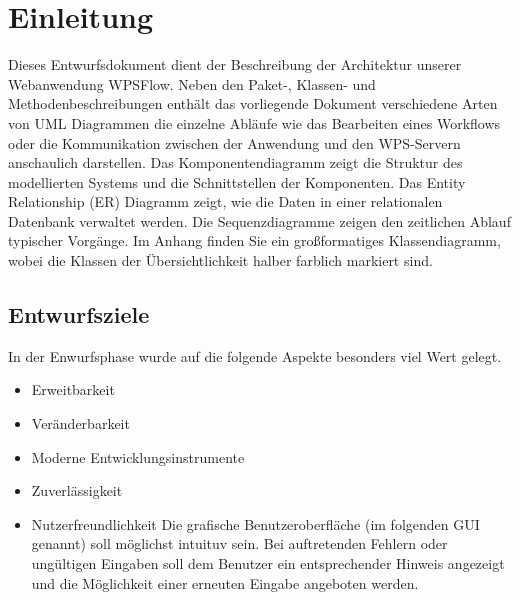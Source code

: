 \chapter{Einleitung}

    Dieses Entwurfsdokument dient der Beschreibung der Architektur unserer Webanwendung WPSFlow.
    Neben den Paket-, Klassen- und Methodenbeschreibungen enthält das vorliegende Dokument verschiedene Arten von UML %
    Diagrammen die einzelne Abläufe wie das Bearbeiten eines Workflows oder die Kommunikation zwischen der Anwendung und den WPS-Servern anschaulich darstellen. \newline
    Das Komponentendiagramm zeigt die Struktur des modellierten Systems und die Schnittstellen der Komponenten. \newline
    Das Entity Relationship (ER) Diagramm zeigt, wie die Daten in einer relationalen Datenbank verwaltet werden.\newline
    Die Sequenzdiagramme zeigen den zeitlichen Ablauf typischer Vorgänge.\newline 
    Im Anhang finden Sie ein großformatiges Klassendiagramm, wobei die Klassen der Übersichtlichkeit halber farblich markiert sind.
    \newline
    \section{Entwurfsziele}
    In der Enwurfsphase wurde auf die folgende Aspekte besonders viel Wert gelegt. 
        \begin{itemize}
            \item Erweitbarkeit
                
            \item Veränderbarkeit
            \item Moderne Entwicklungsinstrumente
            \item Zuverlässigkeit
            \item Nutzerfreundlichkeit \newline
                Die grafische Benutzeroberfläche (im folgenden GUI genannt) soll möglichst intuituv sein. Bei auftretenden Fehlern oder ungültigen Eingaben soll dem Benutzer ein entsprechender Hinweis angezeigt und die Möglichkeit einer erneuten Eingabe angeboten werden.
        \end{itemize}
    
        